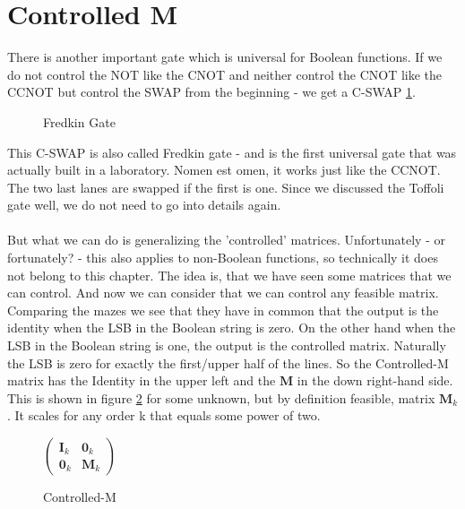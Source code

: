 \documentclass[oneside]{thesisclass}
\begin{document}
\section{Controlled M}
There is another important gate which is universal for Boolean functions.
If we do not control the NOT like the CNOT and neither control the CNOT like the CCNOT but control the SWAP from the beginning - we get a C-SWAP \ref{fred}.
\begin{figure}
 \begin{center}
  \caption{Fredkin Gate}
  \label{fred}
 \end{center}
\end{figure}
This C-SWAP is also called Fredkin gate - and is the first universal gate that was actually built in a laboratory.
Nomen est omen, it works just like the CCNOT.
The two last lanes are swapped if the first is one.
Since we discussed the Toffoli gate well, we do not need to go into details again.\\
\\But what we can do is generalizing the 'controlled' matrices.
Unfortunately - or fortunately? - this also applies to non-Boolean functions, so technically it does not belong to this chapter.
The idea is, that we have seen some matrices that we can control.
And now we can consider that we can control any feasible matrix.
Comparing the mazes we see that they have in common that the output is the identity when the LSB in the Boolean string is zero.
On the other hand when the LSB in the Boolean string is one, the output is the controlled matrix.
Naturally the LSB is zero for exactly the first/upper half of the lines.
So the Controlled-M matrix has the Identity in the upper left and the $\mathbf M$ in the down right-hand side.
This is shown in figure \ref{cm} for some unknown, but by definition feasible, matrix $\mathbf M_k$.
It scales for any order k that equals some power of two.
\begin{figure}
 \begin{center}
  $
 \begin{pmatrix}
  \mathbf I_k & \mathbf 0_k \\
  \mathbf 0_k & \mathbf M_k
  \end{pmatrix}
 $
  \caption{Controlled-M}
  \label{cm}
 \end{center}
\end{figure}
\end{document}

